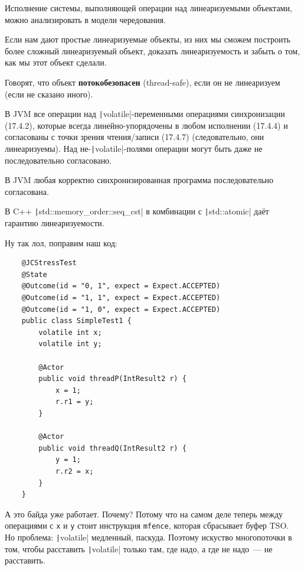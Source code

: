 \documentclass{article}
\begin{document}
\begin{remark}
    Исполнение системы, выполняющей операции над линеаризуемыми объектами, можно анализировать в модели чередования.
\end{remark}
\begin{remark}
    Если нам дают простые линеаризуемые объекты, из них мы сможем построить более сложный линеаризуемый объект, доказать линеаризуемость и забыть о том, как мы этот объект сделали.
\end{remark}
\begin{definition}
    Говорят, что объект \textbf{потокобезопасен} (thread-safe), если он не линеаризуем (если не сказано иного).
\end{definition}
\begin{example}
    В JVM все операции над \texttt|volatile|-переменными операциями синхронизации (17.4.2), которые всегда линейно-упорядочены в любом исполнении (17.4.4) и согласованы с точки зрения чтения/записи (17.4.7) (следовательно, они линеаризуемы). Над не-\texttt|volatile|-полями операции могут быть даже не последовательно согласовано.
\end{example}
\begin{example}
    В JVM любая корректно синхронизированная программа последовательно согласована.
\end{example}
\begin{example}
    В C++ \texttt|std::memory_order::seq_cst| в комбинации с \texttt|std::atomic| даёт гарантию линеаризуемости.
\end{example}
Ну так лол, поправим наш код:
\begin{verbatim}
    @JCStressTest
    @State
    @Outcome(id = "0, 1", expect = Expect.ACCEPTED)
    @Outcome(id = "1, 1", expect = Expect.ACCEPTED)
    @Outcome(id = "1, 0", expect = Expect.ACCEPTED)
    public class SimpleTest1 {
        volatile int x;
        volatile int y;
        
        @Actor
        public void threadP(IntResult2 r) {
            x = 1;
            r.r1 = y;
        }
        
        @Actor
        public void threadQ(IntResult2 r) {
            y = 1;
            r.r2 = x;
        }
    }
\end{verbatim}
А это байда уже работает. Почему? Потому что на самом деле теперь между операциями с \Verb|x| и \Verb|y| стоит инструкция \Verb|mfence|, которая сбрасывает буфер TSO.\\
Но проблема: \texttt|volatile| медленный, паскуда. Поэтому искуство многопоточки в том, чтобы расставить \texttt|volatile| только там, где надо, а где не надо~--- не расставить.
\end{document}
